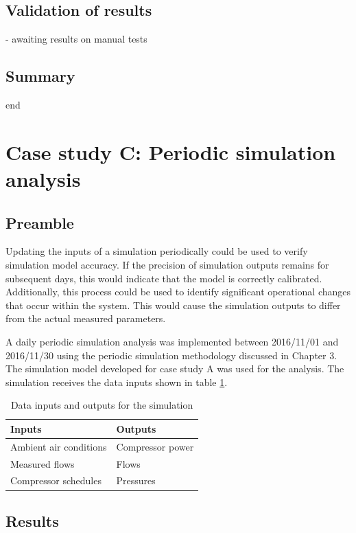 	\subsection{Validation of results}
	
	- awaiting results on manual tests
	
	\subsection{Summary}
	end
\newpage

\section{Case study C: Periodic simulation analysis}
	\subsection{Preamble}
	Updating the inputs of a simulation periodically could be used to verify simulation model accuracy. If the precision of simulation outputs remains for subsequent days, this would indicate that the model is correctly calibrated. Additionally, this process could be used to identify significant operational changes that occur within the system. This would cause the simulation outputs to differ from the actual measured parameters. 
	\par 
	A daily periodic simulation  analysis was implemented between 2016/11/01 and 2016/11/30 using the periodic simulation methodology discussed in Chapter 3. The simulation model developed for case study A was used for the analysis. The simulation receives the data inputs shown in table \ref{table: Periodic inputs/outputs}.
	\begin{table}[h]
		\centering
		\begin{tabular}{ll}
			\hline
			Inputs \hspace*{4cm}    &Outputs \hspace*{4cm}    \\  \hline
			Ambient air conditions&Compressor power \\
			Measured flows& Flows \\
			Compressor schedules& Pressures \\
			\hline
		\end{tabular}
		\caption{Data inputs and outputs for the simulation}
		\label{table: Periodic inputs/outputs}
	\end{table}

\subsection{Results}

